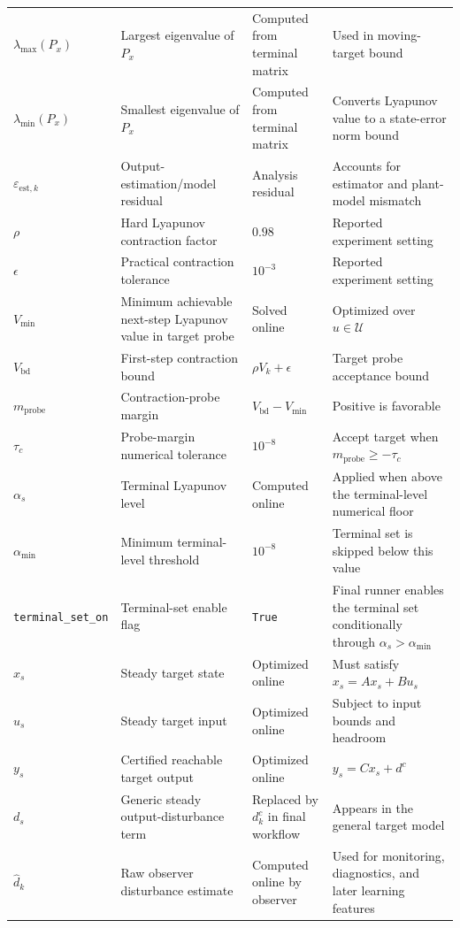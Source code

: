 \documentclass[11pt]{article}
\begin{document}
\begin{longtable}{>{\raggedright\arraybackslash}p{}>{\raggedright\arraybackslash}p{}>{\raggedright\arraybackslash}p{}>{\raggedright\arraybackslash}p{}}
$\lambda_{\max}(P_x)$ & Largest eigenvalue of $P_x$ & Computed from terminal matrix & Used in moving-target bound \\
$\lambda_{\min}(P_x)$ & Smallest eigenvalue of $P_x$ & Computed from terminal matrix & Converts Lyapunov value to a state-error norm bound \\
$\varepsilon_{\mathrm{est},k}$ & Output-estimation/model residual & Analysis residual & Accounts for estimator and plant-model mismatch \\
$\rho$ & Hard Lyapunov contraction factor & $0.98$ & Reported experiment setting \\
$\epsilon$ & Practical contraction tolerance & $10^{-3}$ & Reported experiment setting \\
$V_{\min}$ & Minimum achievable next-step Lyapunov value in target probe & Solved online & Optimized over $u\in\mathcal U$ \\
$V_{\mathrm{bd}}$ & First-step contraction bound & $\rho V_k+\epsilon$ & Target probe acceptance bound \\
$m_{\mathrm{probe}}$ & Contraction-probe margin & $V_{\mathrm{bd}}-V_{\min}$ & Positive is favorable \\
$\tau_c$ & Probe-margin numerical tolerance & $10^{-8}$ & Accept target when $m_{\mathrm{probe}}\ge-\tau_c$ \\
$\alpha_s$ & Terminal Lyapunov level & Computed online & Applied when above the terminal-level numerical floor \\
$\alpha_{\min}$ & Minimum terminal-level threshold & $10^{-8}$ & Terminal set is skipped below this value \\
\texttt{terminal\_set\_on} & Terminal-set enable flag & \texttt{True} & Final runner enables the terminal set conditionally through $\alpha_s>\alpha_{\min}$ \\
$x_s$ & Steady target state & Optimized online & Must satisfy $x_s=A x_s+B u_s$ \\
$u_s$ & Steady target input & Optimized online & Subject to input bounds and headroom \\
$y_s$ & Certified reachable target output & Optimized online & $y_s=Cx_s+d^c$ \\
$d_s$ & Generic steady output-disturbance term & Replaced by $d^c_k$ in final workflow & Appears in the general target model \\
$\hat d_k$ & Raw observer disturbance estimate & Computed online by observer & Used for monitoring, diagnostics, and later learning features \\

\end{longtable}
\end{document}
